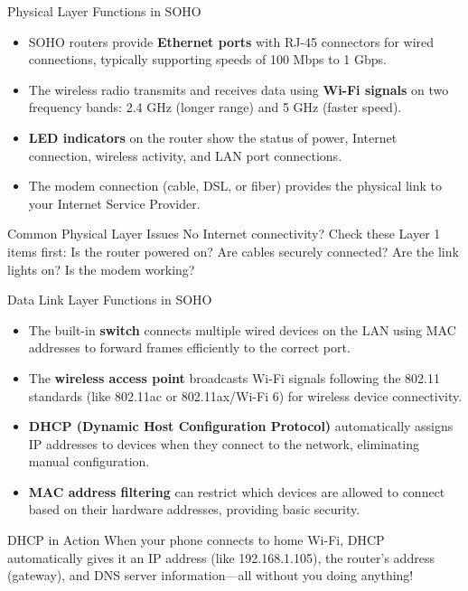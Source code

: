 \documentclass[aspectratio=169]{beamer}
\begin{document}
\begin{frame}{Physical Layer Functions in SOHO}

\begin{itemize}
    \item SOHO routers provide \textbf{Ethernet ports} with RJ-45 connectors for wired connections, typically supporting speeds of 100 Mbps to 1 Gbps.
    \item The wireless radio transmits and receives data using \textbf{Wi-Fi signals} on two frequency bands: 2.4 GHz (longer range) and 5 GHz (faster speed).
    \item \textbf{LED indicators} on the router show the status of power, Internet connection, wireless activity, and LAN port connections.
    \item The modem connection (cable, DSL, or fiber) provides the physical link to your Internet Service Provider.
\end{itemize}

\vspace{0.3cm}

\begin{alertblock}{Common Physical Layer Issues}
No Internet connectivity? Check these Layer 1 items first: Is the router powered on? Are cables securely connected? Are the link lights on? Is the modem working?
\end{alertblock}

\end{frame}

\begin{frame}{Data Link Layer Functions in SOHO}

\begin{itemize}
    \item The built-in \textbf{switch} connects multiple wired devices on the LAN using MAC addresses to forward frames efficiently to the correct port.
    \item The \textbf{wireless access point} broadcasts Wi-Fi signals following the 802.11 standards (like 802.11ac or 802.11ax/Wi-Fi 6) for wireless device connectivity.
    \item \textbf{DHCP (Dynamic Host Configuration Protocol)} automatically assigns IP addresses to devices when they connect to the network, eliminating manual configuration.
    \item \textbf{MAC address filtering} can restrict which devices are allowed to connect based on their hardware addresses, providing basic security.
\end{itemize}

\vspace{0.3cm}

\begin{block}{DHCP in Action}
When your phone connects to home Wi-Fi, DHCP automatically gives it an IP address (like 192.168.1.105), the router's address (gateway), and DNS server information—all without you doing anything!
\end{block}

\end{frame}
\end{document}

